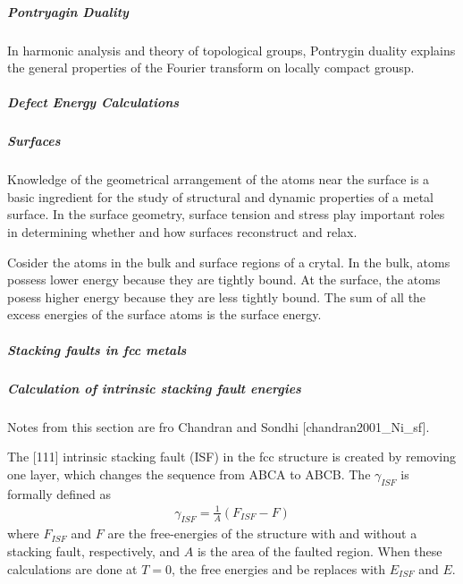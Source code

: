 \documentclass[letterpaper,10pt,english]{sphinxmanual}
\begin{document}
\subparagraph{Pontryagin Duality}
\label{\detokenize{crystallography/reciprocal_lattice:pontryagin-duality}}
In harmonic analysis and theory of topological groups,  Pontrygin duality explains the general properties of
the Fourier transform on locally compact grousp.


\subparagraph{Defect Energy Calculations}
\label{\detokenize{crystallography/defect_energy:defect-energy-calculations}}\label{\detokenize{crystallography/defect_energy::doc}}

\subparagraph{Surfaces}
\label{\detokenize{crystallography/surface_energy:surfaces}}\label{\detokenize{crystallography/surface_energy::doc}}
Knowledge of the geometrical arrangement of the atoms near the surface is a basic ingredient for the study of structural and dynamic properties of a metal surface.  In the surface geometry, surface tension and stress play important roles in determining whether and how surfaces reconstruct and relax.

Cosider the atoms in the bulk and surface regions of a crytal.  In the bulk, atoms possess lower energy because they are tightly bound.  At the surface, the atoms posess higher energy because they are less tightly bound.  The sum of all the excess energies of the surface atoms is the surface energy.


\subparagraph{Stacking faults in fcc metals}
\label{\detokenize{crystallography/fcc_sf:stacking-faults-in-fcc-metals}}\label{\detokenize{crystallography/fcc_sf:fcc-stacking-faults}}\label{\detokenize{crystallography/fcc_sf::doc}}

\subparagraph{Calculation of intrinsic stacking fault energies}
\label{\detokenize{crystallography/fcc_sf:calculation-of-intrinsic-stacking-fault-energies}}
Notes from this section are fro Chandran and Sondhi {[}chandran2001\_Ni\_sf{]}.

The {[}111{]} intrinsic stacking fault (ISF) in the fcc structure is created by removing one layer, which changes the sequence from ABCA to ABCB.
The \(\gamma_{ISF}\) is formally defined as
\begin{equation*}
\begin{split}\gamma_{ISF} = \frac{1}{A}(F_{ISF} - F)\end{split}
\end{equation*}
where \(F_{ISF}\) and \(F\) are the free-energies of the structure with and without a stacking fault, respectively, and \(A\) is the area of the faulted region.  When these calculations are done at \(T=0\), the free energies and be replaces with \(E_{ISF}\) and \(E\).
\end{document}
